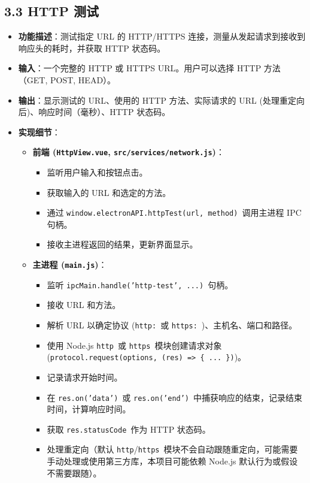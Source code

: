 \documentclass{article}
\begin{document}
\subsection*{3.3 HTTP 测试}

\begin{itemize}
    \item \textbf{功能描述}：测试指定 URL 的 HTTP/HTTPS 连接，测量从发起请求到接收到响应头的耗时，并获取 HTTP 状态码。
    \item \textbf{输入}：一个完整的 HTTP 或 HTTPS URL。用户可以选择 HTTP 方法（GET, POST, HEAD）。
    \item \textbf{输出}：显示测试的 URL、使用的 HTTP 方法、实际请求的 URL (处理重定向后)、响应时间（毫秒）、HTTP 状态码。
    \item \textbf{实现细节}：
    \begin{itemize}
        \item \textbf{前端 (\texttt{HttpView.vue}, \texttt{src/services/network.js})}：
        \begin{itemize}
            \item 监听用户输入和按钮点击。
            \item 获取输入的 URL 和选定的方法。
            \item 通过 \texttt{window.electronAPI.httpTest(url, method)}\ 调用主进程 IPC 句柄。
            \item 接收主进程返回的结果，更新界面显示。
        \end{itemize}
        \item \textbf{主进程 (\texttt{main.js})}：
        \begin{itemize}
            \item 监听 \texttt{ipcMain.handle('http-test', ...)}\ 句柄。
            \item 接收 URL 和方法。
            \item 解析 URL 以确定协议 (\texttt{http:}\ 或 \texttt{https:}\ )、主机名、端口和路径。
            \item 使用 Node.js \texttt{http}\ 或 \texttt{https}\ 模块创建请求对象 (\texttt{protocol.request(options, (res) => \{ ... \})})。
            \item 记录请求开始时间。
            \item 在 \texttt{res.on('data')}\ 或 \texttt{res.on('end')}\ 中捕获响应的结束，记录结束时间，计算响应时间。
            \item 获取 \texttt{res.statusCode}\ 作为 HTTP 状态码。
            \item 处理重定向（默认 \texttt{http}/\texttt{https}\ 模块不会自动跟随重定向，可能需要手动处理或使用第三方库，本项目可能依赖 Node.js 默认行为或假设不需要跟随）。

\end{itemize}
\end{itemize}
\end{itemize}
\end{document}
